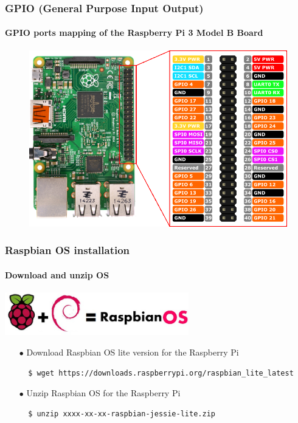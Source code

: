 \documentclass{beamer}
\begin{document}

\begin{frame}
\frametitle{\textbf{GPIO (General Purpose Input Output)}}
\framesubtitle{\textbf{GPIO ports mapping of the Raspberry Pi 3 Model B Board}}
\begin{figure}
\centering
\includegraphics[scale=1]{imgs/gpio.png}
\end{figure}
\end{frame}


\begin{frame}[fragile]
\frametitle{\textbf{Raspbian OS installation}}
\framesubtitle{\textbf{Download and unzip OS}}

\begin{center}
\includegraphics[width=0.60\textwidth]{imgs/raspbian_logo.jpg}
\end{center}
\begin{itemize}
\item[$\bullet$] Download Raspbian OS lite version for the Raspberry Pi
\begin{lstlisting}
  $ wget https://downloads.raspberrypi.org/raspbian_lite_latest
\end{lstlisting}
\item[$\bullet$] Unzip Raspbian OS for the Raspberry Pi
\begin{lstlisting}
  $ unzip xxxx-xx-xx-raspbian-jessie-lite.zip
\end{lstlisting}
\end{itemize}

\end{frame}
\end{document}
